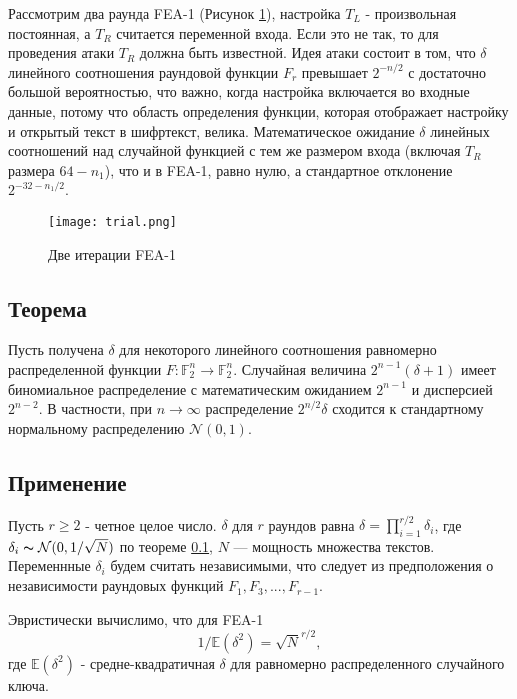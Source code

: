 \documentclass[utf8x, 14pt]{G7-32} %
\begin{document}
Рассмотрим два раунда FEA-1 (Рисунок \ref{fig:trial}), настройка $T_L$ - произвольная постоянная, а $T_R$ считается переменной входа. Если это не так, то для проведения атаки $T_R$ должна быть известной. Идея атаки состоит в том, что $\delta$  линейного соотношения раундовой функции $F_r$ превышает $ 2^{-n/2}$ с достаточно большой вероятностью, что важно, когда настройка включается во входные данные, потому что область определения функции, которая отображает настройку и открытый текст в шифртекст, велика. Математическое ожидание $\delta$ линейных соотношений над случайной функцией с тем же размером входа (включая $T_R$ размера $64-n_1$), что и в FEA-1, равно нулю, а стандартное отклонение $2^{-32-n_1/2}$. 

\begin{figure}[h!]
	\centering
	\texttt{[image: trial.png]}
	\caption{Две итерации FEA-1}
	\label{fig:trial}
\end{figure}

\subsection{Теорема}\label{theorem}

 Пусть получена $\delta$ для некоторого линейного соотношения равномерно распределенной функции $F: \mathbb{F}_2^n \to \mathbb{F}_2^n$. Случайная величина $2^{n-1}(\delta+1)$ имеет биномиальное распределение с математическим ожиданием $2^{n-1}$ и дисперсией $2^{n-2}$. В частности, при $n\to\infty$ распределение $2^{n/2}\delta$ сходится к стандартному нормальному распределению $\mathcal{N}(0,1)$.

\subsection{Применение}

Пусть $r\geq 2$ - четное целое число. $\delta$ для $r$ раундов равна $\delta=\prod_{i=1}^{r/2} \delta_i$, где $\delta_i \thicksim \mathcal{N}(0,1/\sqrt{N})$ по теореме \ref{theorem}, $N$ --- мощность множества текстов. Переменнные $\delta_i$ будем считать независимыми, что следует из предположения о независимости раундовых функций $F_1, F_3, ..., F_{r-1}$.

Эвристически вычислимо, что для FEA-1
\begin{equation}
\label{eqn:keyeq}
1/\mathbb{E}(\delta^2)=\sqrt{N}^{r/2},\end{equation} 
где $\mathbb{E}(\delta^2)$ - средне-квадратичная $\delta$ для равномерно распределенного случайного ключа.
\end{document}

